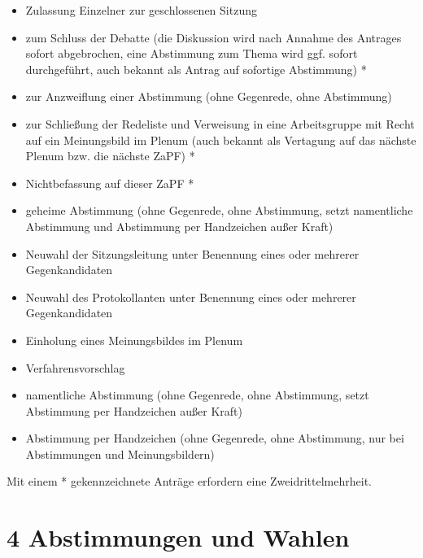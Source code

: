 \documentclass[12pt,oneside]{scrartcl}
\begin{document}
\begin{enumerate}
\begin{itemize}
\item Zulassung Einzelner zur geschlossenen Sitzung

\item zum Schluss der Debatte (die Diskussion wird nach Annahme des
Antrages sofort abgebrochen, eine Abstimmung zum Thema wird ggf.
sofort durchgeführt, auch bekannt als \textquotedbl{}Antrag auf sofortige Abstimmung\textquotedbl{}) *

\item zur Anzweiflung einer Abstimmung (ohne Gegenrede, ohne Abstimmung)

\item zur Schließung der Redeliste und Verweisung in eine Arbeitsgruppe mit
Recht auf ein Meinungsbild im Plenum (auch bekannt als \textquotedbl{}Vertagung auf das
nächste Plenum bzw. die nächste ZaPF\textquotedbl{}) *

\item Nichtbefassung auf dieser ZaPF *

\item geheime Abstimmung (ohne Gegenrede, ohne Abstimmung, setzt namentliche
Abstimmung und Abstimmung per Handzeichen außer Kraft)

\item Neuwahl der Sitzungsleitung unter Benennung eines oder mehrerer Gegenkandidaten

\item Neuwahl des Protokollanten unter Benennung eines oder mehrerer Gegenkandidaten

\item Einholung eines Meinungsbildes im Plenum

\item Verfahrensvorschlag

\item namentliche Abstimmung (ohne Gegenrede, ohne Abstimmung, setzt Abstimmung
per Handzeichen außer Kraft)

\item Abstimmung per Handzeichen (ohne Gegenrede, ohne Abstimmung, nur bei
Abstimmungen und Meinungsbildern)
\end{itemize}

Mit einem * gekennzeichnete Anträge erfordern eine Zweidrittelmehrheit.
\end{enumerate}


\section{4 Abstimmungen und Wahlen%
  \label{abstimmungen-und-wahlen}%
}
\end{document}

